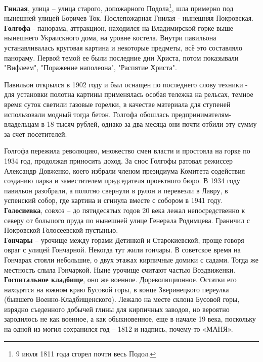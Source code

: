 \textbf{Гнилая}, улица – улица старого, допожарного Подола\footnote{9 июля 1811 года сгорел почти весь Подол.}, шла примерно под нынешней улицей Боричев Ток. Послепожарная Гнилая - нынешняя Покровская.\\

\textbf{Голгофа} - панорама, аттракцион, находился на Владимирской горке выше нынешнего Украискного дома, на уровне костела. Внутри павильона устанавливалась круговая картина и некоторые предметы, всё это составляло панораму. Первой темой ее были последние дни Христа, потом показывали "Вифлеем", "Поражение наполеона", "Распятие Христа".

    Павильон открылся в 1902 году и был оснащен по последнего слову техники - для установки полотна картины применялась особая тележка на рельсах, темное время суток светили газовые горелки, в качестве материала для ступеней использовали модный тогда бетон. Голгофа обошлась предпринимателям-владельцам в 18 тысяч рублей, однако за два месяца они почти отбили эту сумму за счет посетителей.

    Голгофа пережила революцию, множество смен власти и простояла на горке по 1934 год, продолжая приносить доход. За снос Голгофы ратовал режиссер Александр Довженко, коего избрали членом президиума Комитета содействия созданию парка и заместителем председателя проектного бюро. В 1934 году павильон разобрали, а полотно свернули в рулон и перевезли в Лавру, в успенский собор, где картина и сгинула вместе с собором в 1941 году.\\


\textbf{Голосиевка}, совхоз – до пятидесятых годов 20 века лежал непосредственно к северу от большого пруда по нынешней улице Генерала Родимцева. Граничил с Покровской Голосеевской пустынью.\\

\textbf{Гончары} – урочище между горами Детинкой и Старокиевской, проще говоря овраг с улицей Гончарной. Некогда тут жили гончары. В советское время на Гончарах стояли небольшие, о двух этажах кирпичные домики с садами. Тогда же местность слыла Гончаркой. Ныне урочище считают частью Воздвиженки.\\

\textbf{Госпитальное кладбище}, оно же военное. Дореволюционное. Остатки его находятся на южном краю Бусовой горы, в конце Зверинецкого переулка (бывшего Военно-Кладбищенско\-го). Лежало на месте склона Бусовой горы, изрядно съеденного добычей глины для кирпичных заводов, но вероятно зародилось не как военное, а как обыкновенное, еще в начале 19 века, поскольку на одной из могил сохранился год – 1812 и надпись, почему-то «МАНЯ».

